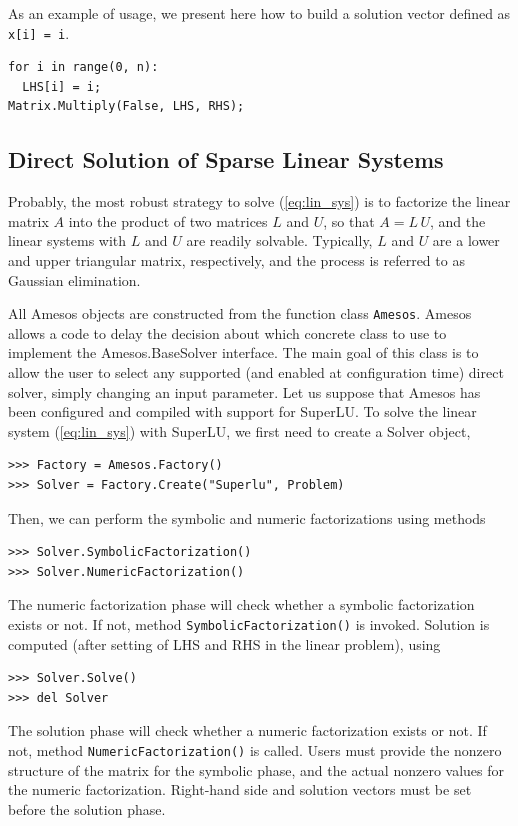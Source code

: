 \documentclass[10pt,relax]{SANDreport}
\begin{document}
As an example of usage, we present here how to build a solution vector
defined as \verb!x[i] = i!.
\begin{verbatim}
for i in range(0, n):
  LHS[i] = i;
Matrix.Multiply(False, LHS, RHS);
\end{verbatim}

\subsection{Direct Solution of Sparse Linear Systems}
\label{sec:direct}

Probably, the most robust strategy to solve (\ref{eq:lin_sys}) is to factorize
the linear matrix $A$ into the product of two matrices $L$ and $U$, so that
$A = L \, U$, and 
the linear systems with $L$ and $U$ are readily solvable. Typically,
$L$ and $U$ are a lower and upper triangular matrix, respectively, and the
process is referred to as Gaussian elimination. 

All Amesos objects are constructed from the function class
\verb!Amesos!.  Amesos allows a code to delay the
decision about which concrete class to use to implement the
Amesos.BaseSolver interface. The main goal of this class is to allow
the user to select any supported (and enabled at configuration time)
direct solver, simply changing an input parameter. Let us suppose that Amesos
has been configured and compiled with support for SuperLU. To solve the linear
system (\ref{eq:lin_sys}) with SuperLU, we first need to create a Solver
object,
\begin{verbatim}
>>> Factory = Amesos.Factory()
>>> Solver = Factory.Create("Superlu", Problem)
\end{verbatim}
Then, we can perform the symbolic and numeric factorizations using methods
\begin{verbatim}
>>> Solver.SymbolicFactorization()
>>> Solver.NumericFactorization()
\end{verbatim}
The numeric factorization phase will check whether a symbolic
factorization exists or not. If not, method
\verb!SymbolicFactorization()! is invoked.  Solution is computed (after
setting of LHS and RHS in the linear problem), using
\begin{verbatim}
>>> Solver.Solve()
>>> del Solver
\end{verbatim}
The solution phase will check whether a numeric factorization exists or
not. If not, method \verb!NumericFactorization()! is called.
Users must provide the nonzero structure of the matrix for the symbolic
phase, and the actual nonzero values for the numeric
factorization. Right-hand side and solution vectors must be set before
the solution phase.
  
\end{document}

